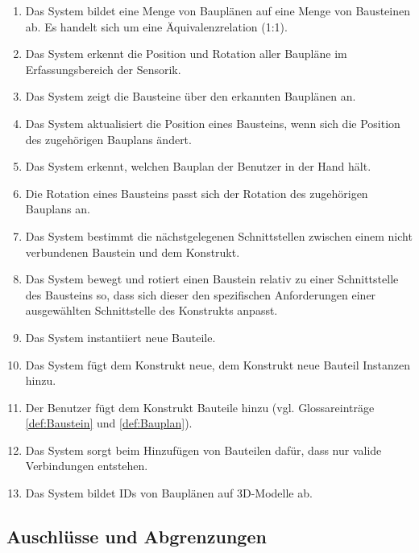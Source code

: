 \begin{enumerate}
	\item Das System bildet eine Menge von Bauplänen auf eine Menge von Bausteinen ab. Es handelt sich um eine Äquivalenzrelation (1:1).
	\item Das System erkennt die Position und Rotation aller Baupläne im Erfassungsbereich der Sensorik.
	\item Das System zeigt die Bausteine über den erkannten Bauplänen an.
	\item Das System aktualisiert die Position eines Bausteins, wenn sich die Position des zugehörigen Bauplans ändert.
	\item Das System erkennt, welchen Bauplan der Benutzer in der Hand hält.
	\item Die Rotation eines Bausteins passt sich der Rotation des zugehörigen Bauplans an.
	\item Das System bestimmt die nächstgelegenen Schnittstellen zwischen einem nicht verbundenen Baustein und dem Konstrukt.
	\item Das System bewegt und rotiert einen Baustein relativ zu einer Schnittstelle des Bausteins so, dass sich dieser den spezifischen Anforderungen einer ausgewählten Schnittstelle des Konstrukts anpasst.
	\item Das System instantiiert neue Bauteile.
	\item Das System fügt dem Konstrukt neue, dem Konstrukt neue Bauteil Instanzen hinzu.
	\item Der Benutzer fügt dem Konstrukt Bauteile hinzu (vgl. Glossareinträge \ref{def:Baustein} und \ref{def:Bauplan}).
	\item Das System sorgt beim Hinzufügen von Bauteilen dafür, dass nur valide Verbindungen entstehen.
	\item Das System bildet IDs von Bauplänen auf 3D-Modelle ab.
\end{enumerate}

\subsection{Auschlüsse und Abgrenzungen}

